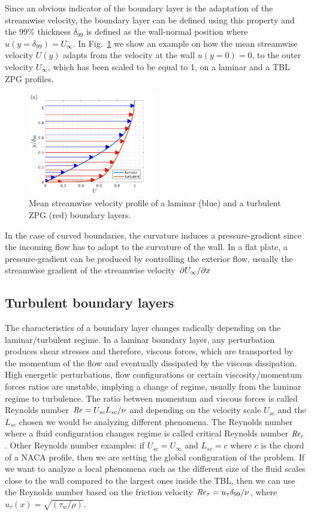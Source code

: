 Since an obvious indicator of the boundary layer is the adaptation of the streamwise velocity, the boundary layer can be defined using this property and the $99\%$ thickness $\delta_{99}$ is defined as the wall-normal position where $u(y=\delta_{99}) = U_{\infty}$.
In Fig.~\ref{fig:lam_turb_profiles} we show an example on how the mean streamwise velocity $U(y)$ adapts from the velocity at the wall $u(y=0)=0$, to the outer velocity $U_{\infty}$, which has been scaled to be equal to 1, on a laminar and a TBL ZPG profiles.

\begin{figure}[h!]
\centering
\includegraphics[width=0.5\textwidth]{ZPG_lam_turb.jpg}
\caption{ \label{fig:lam_turb_profiles} Mean streamwise velocity profile of a laminar (blue) and a turbulent ZPG (red) boundary layers.
   }
\end{figure}

In the case of curved boundaries, the curvature induces a pressure-gradient since the incoming flow has to adapt to the curvature of the wall. In a flat plate, a pressure-gradient can be produced by controlling the exterior flow, usually the streamwise gradient of the streamwise velocity $\pdv{U_{\infty}}/{x}$


\subsection{Turbulent boundary layers}
The characteristics of a boundary layer changes radically depending on the laminar/turbulent regime.
In a laminar boundary layer, any perturbation produces shear stresses and therefore, viscous forces, which are transported by the momentum of the flow and eventually dissipated by the viscous dissipation. 
High energetic perturbations, flow configurations or certain viscosity/momentum forces ratios are unstable, implying a change of regime, usually from the laminar regime to turbulence. 
The ratio between momentum and viscous forces is called Reynolds number $\mbox{\textit{Re}}=U_{sc} L_{sc} / \nu$ and depending on the velocity scale $U_{sc}$ and the $L_{sc}$ chosen we would be analyzing different phenomena. The Reynolds number where a fluid configuration changes regime is called critical Reynolds number $\mbox{\textit{Re}}_c$.
Other Reynolds number examples: if $U_{sc}=U_{\infty}$ and $L_{sc}=c$ where $c$ is the chord of a NACA profile, then we are setting the global configuration of the problem. If we want to analyze a local phenomena such as the different size of the fluid scales close to the wall compared to the largest ones inside the TBL, then we can use the Reynolds number based on the friction velocity $\mbox{\textit{Re}}_{\tau}=u_{\tau}\delta_{99}/\nu$, where  $u_{\tau}(x)=\sqrt{(\tau_w / \rho)}$.

